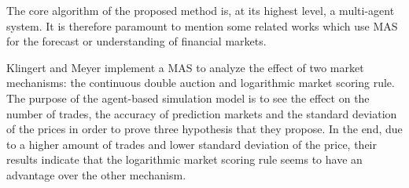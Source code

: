 \documentclass[a4paper,twoside]{article}
\begin{document}



The core algorithm of the proposed method is, at its highest level, a
multi-agent system. It is therefore paramount to mention some related
works which use MAS for the forecast or understanding of financial
markets. 

Klingert and Meyer \cite{Klingert_2012} implement a MAS to analyze the
effect of two market mechanisms: the continuous double auction and
logarithmic market scoring rule. The purpose of the agent-based
simulation model is to see the effect on the number of trades, the
accuracy of prediction markets and the standard deviation of the
prices in order to prove three hypothesis that they propose. In the
end, due to a higher amount of trades and lower standard deviation of
the price, their results indicate that the logarithmic market scoring
rule seems to have an advantage over the other mechanism. 
\end{document}
